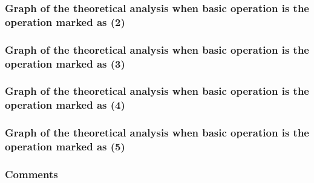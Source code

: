 \documentclass[11pt, oneside, a4paper]{article}
\begin{document}
	\subsubsection{Graph of the theoretical analysis when basic operation is the operation marked as (2)}

	\subsubsection{Graph of the theoretical analysis when basic operation is the operation marked as (3)}

	\subsubsection{Graph of the theoretical analysis when basic operation is the operation marked as (4)}

	\subsubsection{Graph of the theoretical analysis when basic operation is the operation marked as (5)}

	\subsubsection{Comments}
\end{document}
